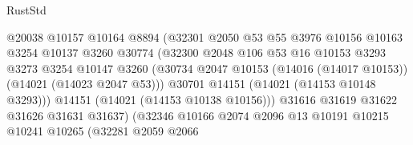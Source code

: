 \begin{lexlean}{RustStd}
\begin{coremodule}
                                      @20038
                                      @10157
                                      @10164
                                      @8894
                                      (@32301
                                        @2050
                                        @53
                                        @55
                                        @3976
                                        @10156
                                        @10163
                                        @3254
                                        @10137
                                        @3260
                                        @30774
                                        (@32300
                                          @2048
                                          @106
                                          @53
                                          @16
                                          @10153
                                          @3293
                                          @3273
                                          @3254
                                          @10147
                                          @3260
                                          (@30734
                                            @2047
                                            @10153
                                            (@14016 (@14017 @10153))
                                            (@14021 (@14023 @2047 @53)))
                                          @30701
                                          @14151
                                          (@14021 (@14153 @10148 @3293)))
                                        @14151
                                        (@14021 (@14153 @10138 @10156)))
                                      @31616
                                      @31619
                                      @31622
                                      @31626
                                      @31631
                                      @31637)
                                    (@32346
                                      @10166
                                      @2074
                                      @2096
                                      @13
                                      @10191
                                      @10215
                                      @10241
                                      @10265
                                      (@32281
                                        @2059
                                        @2066

\end{coremodule}
\end{lexlean}

